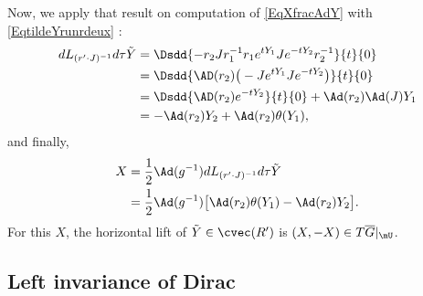 Now, we apply that result on computation of \eqref{EqXfracAdY} with \eqref{EqtildeYrunrdeux} :
\begin{align*}
dL_{(r'\cdot J)^{-1}}d\tau\tilde Y&=\Dsdd{ -r_2Jr_1^{-1}r_1 e^{tY_{1}}J e^{-tY_{2}}r_2^{-1} }{t}{0}\\
        &=\Dsdd{ \AD(r_2)\big( -J e^{tY_{1}}J e^{-tY_{2}} \big) }{t}{0}\\
        &=\Dsdd{ \AD(r_2) e^{-tY_{2}} }{t}{0}+\Ad(r_2)\Ad(J)Y_{1}\\
        &=-\Ad(r_2)Y_{2}+\Ad(r_2)\theta(Y_{1}),
\end{align*}
and finally,
\begin{equation}  \label{EqValeurXAdtheta}
\begin{aligned}
X&=\frac{ 1 }{2}\Ad(g^{-1})dL_{(r'\cdot J)^{-1}}d\tau\tilde Y\\
        &=\frac{ 1 }{2}\Ad(g^{-1})\big[ \Ad(r_2)\theta(Y_{1})-\Ad(r_2)Y_{2} \big].
\end{aligned}
\end{equation}
For this $X$, the horizontal lift of $\tilde Y\in\cvec(R')$ is $(X,-X)\in T\overline{G}|_{\mU}$.

\subsection{Left invariance of Dirac}

